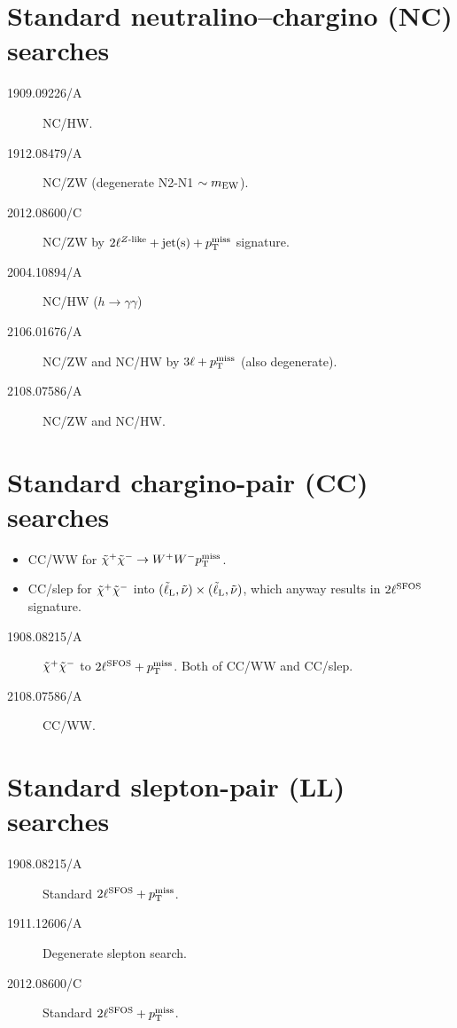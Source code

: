 \section[Standard NC searches]{Standard neutralino--chargino (NC) searches}

\begin{description}
\item[1909.09226/A] NC/HW.
\item[1912.08479/A] NC/ZW (degenerate N2-N1 $\sim m\w{EW}$).
\item[2012.08600/C] NC/ZW by $2\ell\wZlike+\text{jet(s)}+\mpT$ signature.
\item[2004.10894/A] NC/HW ($h\to\gamma\gamma$)
\item[2106.01676/A] NC/ZW and NC/HW by $3\ell+\mpT$ (also degenerate).
\item[2108.07586/A] NC/ZW and NC/HW.
\end{description}


\section[Standard CC searches]{Standard chargino-pair (CC) searches}
\begin{itemize}
 \item CC/WW for $\charP\charM\to W^+W^-\mpT$.
 \item CC/slep for $\tilde\chi^+_{\relax}\tilde\chi^-_{\relax}$ into $(\slepL,\snu)\times(\slepL,\snu)$, which anyway results in $2\ell\wSFOS$ signature.
\end{itemize}


\begin{description}
\item[1908.08215/A] $\tilde\chi^+_{\relax}\tilde\chi^-_{\relax}$ to $2\ell\wSFOS+\mpT$. Both of CC/WW and CC/slep.
\item[2108.07586/A] CC/WW.
\end{description}



\section[Standard LL searches]{Standard slepton-pair (LL) searches}
\begin{description}
\item[1908.08215/A] Standard $2\ell\wSFOS+\mpT$.
\item[1911.12606/A] Degenerate slepton search.
\item[2012.08600/C] Standard $2\ell\wSFOS+\mpT$.
\end{description}

